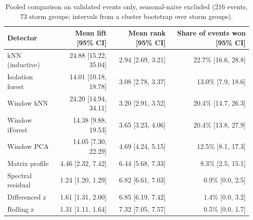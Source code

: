 \begin{table}[t]
\centering
\small
\begin{tabular}{lrrr}
\toprule
Detector & Mean lift [95\% CI] & Mean rank [95\% CI] & Share of events won [95\% CI] \\
\midrule
kNN (inductive) & 24.88 [15.22, 35.04] & 2.94 [2.69, 3.21] & 22.7\% [16.6, 28.8] \\
Isolation forest & 14.01 [10.18, 18.78] & 3.08 [2.78, 3.37] & 13.0\% [7.9, 18.6] \\
Window kNN & 24.20 [14.94, 34.11] & 3.20 [2.91, 3.52] & 20.4\% [14.7, 26.3] \\
Window iForest & 14.38 [9.88, 19.53] & 3.65 [3.23, 4.06] & 20.4\% [13.8, 27.9] \\
Window PCA & 14.05 [7.30, 22.29] & 4.69 [4.24, 5.15] & 12.5\% [8.1, 17.3] \\
Matrix profile & 4.46 [2.32, 7.42] & 6.44 [5.68, 7.33] & 8.3\% [2.5, 15.1] \\
Spectral residual & 1.24 [1.20, 1.29] & 6.82 [6.61, 7.03] & 0.9\% [0.0, 2.5] \\
Differenced z & 1.61 [1.31, 2.00] & 6.85 [6.19, 7.42] & 1.4\% [0.0, 3.2] \\
Rolling z & 1.31 [1.11, 1.64] & 7.32 [7.05, 7.57] & 0.5\% [0.0, 1.7] \\
\bottomrule
\end{tabular}
\caption{Pooled comparison on validated events only, seasonal-naive excluded (216 events, 73 storm groups; intervals from a cluster bootstrap over storm groups).}
\label{tab:step10-validated}
\end{table}